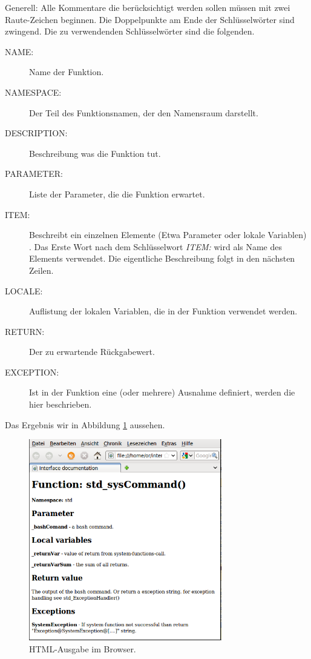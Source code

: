 \documentclass[10pt,a4paper]{article}
\begin{document}
\bigskip 

Generell: Alle Kommentare die berücksichtigt werden sollen müssen mit zwei Raute-Zeichen beginnen. Die Doppelpunkte am Ende der Schlüsselwörter sind zwingend. Die zu verwendenden Schlüsselwörter sind die folgenden. 

\bigskip 

\begin{description}
 \item[NAME:] Name der Funktion.
 \item[NAMESPACE:] Der Teil des Funktionsnamen, der den Namensraum darstellt.
 \item[DESCRIPTION:] Beschreibung was die Funktion tut.
 \item[PARAMETER:] Liste der Parameter, die die Funktion erwartet.
 \item[ITEM:] Beschreibt ein einzelnen Elemente (Etwa Parameter oder lokale Variablen) . Das Erste Wort nach dem Schlüsselwort \textit{ITEM:} wird als Name des Elements verwendet. Die eigentliche Beschreibung folgt in den nächsten Zeilen. 
 \item[LOCALE:] Auflistung der lokalen Variablen, die in der Funktion verwendet werden.
 \item[RETURN:] Der zu erwartende Rückgabewert.
 \item[EXCEPTION:] Ist in der Funktion eine (oder mehrere) Ausnahme definiert, werden die hier beschrieben. 
 \end{description}

\bigskip 
Das Ergebnis wir in Abbildung \ref{pic:html} aussehen.

\begin{figure}[H]
 \centering
 \includegraphics[width=0.75\textwidth]{./awk-html-conv.png}
 \caption[]{HTML-Ausgabe im Browser.}
 \label{pic:html}
\end{figure}
 
\end{document}
